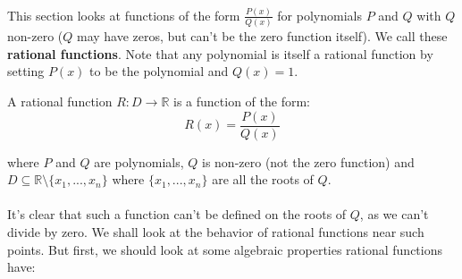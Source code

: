 \documentclass[12pt, a4paper, titlepage, twoside]{article}
\newcommand*{\R}{\mathbb{R}}
\begin{document}
	\paragraph{}
	This section looks at functions of the form $\frac{P(x)}{Q(x)}$ for polynomials $P$ and $Q$ with $Q$ non-zero ($Q$ may have zeros, 
	but can't be the zero function itself). We call these \textbf{rational functions}. Note that any polynomial is itself a rational function 
	by setting $P(x)$ to be the polynomial and $Q(x) = 1$. \\
	
	\begin{kp}
		A rational function $R : D \to \R$ is a function of the form:
		\[ R(x) = \dfrac{P(x)}{Q(x)} \]
		
		where $P$ and $Q$ are polynomials, $Q$ is non-zero (not the zero function) and $D \subseteq \R \setminus \{x_1, ..., x_n\}$ where 
		$\{x_1, ..., x_n\}$ are all the roots of $Q$.
	\end{kp}
	
	\paragraph{}
	It's clear that such a function can't be defined on the roots of $Q$, as we can't divide by zero. We shall look at the behavior of rational
	functions near such points. But first, we should look at some algebraic properties rational functions have:\\
	
\end{document}
